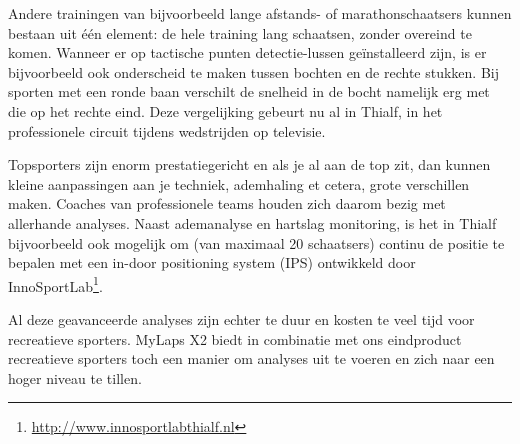 Andere trainingen van bijvoorbeeld lange afstands- of marathonschaatsers kunnen bestaan uit één element: de hele training lang schaatsen, zonder overeind te komen. Wanneer er op tactische punten detectie-lussen geïnstalleerd zijn, is er bijvoorbeeld ook onderscheid te maken tussen bochten en de rechte stukken. Bij sporten met een ronde baan verschilt de snelheid in de bocht namelijk erg met die op het rechte eind. Deze vergelijking gebeurt nu al in Thialf, in het professionele circuit tijdens wedstrijden op televisie.

Topsporters zijn enorm prestatiegericht en als je al aan de top zit, dan kunnen kleine aanpassingen aan je techniek, ademhaling et cetera, grote verschillen maken. Coaches van professionele teams houden zich daarom bezig met allerhande analyses. Naast ademanalyse en hartslag monitoring, is het in Thialf bijvoorbeeld ook mogelijk om (van maximaal 20 schaatsers) continu de positie te bepalen met een in-door positioning system (IPS) ontwikkeld door InnoSportLab\footnote{\url{http://www.innosportlabthialf.nl}}.

Al deze geavanceerde analyses zijn echter te duur en kosten te veel tijd voor recreatieve sporters. MyLaps X2 biedt in combinatie met ons eindproduct recreatieve sporters toch een manier om analyses uit te voeren en zich naar een hoger niveau te tillen.